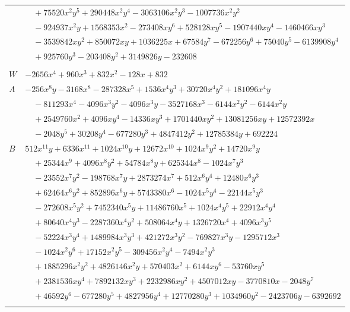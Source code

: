 \documentclass[11pt]{article}
\begin{document}
\begin{longtable}{@{}ll@{}}
 & $\quad +75520x^{2}y^{5}+290448x^{2}y^{4}-3063106x^{2}y^{3}-1007736x^{2}y^{2}$\\
 & $\quad -924937x^{2}y+1568353x^{2}-273408xy^{6}+528128xy^{5}-1907440xy^{4}-1460466xy^{3}$\\
 & $\quad -3539842xy^{2}+850072xy+1036225x+67584y^{7}-672256y^{6}+75040y^{5}-6139908y^{4}$\\
 & $\quad +925760y^{3}-203408y^{2}+3149826y-232608$\\
\addlinespace[3pt]
\multicolumn{2}{@{}l}{$i=20$, $m=16$, neighbours $0,5,9,14,15,21,37$}\\
$W$ & $-2656x^{4}+960x^{3}+832x^{2}-128x+832$\\
$A$ & $-256x^{8}y-3168x^{8}-287328x^{5}+1536x^{4}y^{3}+30720x^{4}y^{2}+181096x^{4}y$\\
 & $\quad -811293x^{4}-4096x^{3}y^{2}-4096x^{3}y-3527168x^{3}-6144x^{2}y^{2}-6144x^{2}y$\\
 & $\quad +2549760x^{2}+4096xy^{4}-14336xy^{3}+1701440xy^{2}+13081256xy+12572392x$\\
 & $\quad -2048y^{5}+30208y^{4}-677280y^{3}+4847412y^{2}+12785384y+692224$\\
$B$ & $512x^{11}y+6336x^{11}+1024x^{10}y+12672x^{10}+1024x^{9}y^{2}+14720x^{9}y$\\
 & $\quad +25344x^{9}+4096x^{8}y^{2}+54784x^{8}y+625344x^{8}-1024x^{7}y^{3}$\\
 & $\quad -23552x^{7}y^{2}-198768x^{7}y+2873274x^{7}+512x^{6}y^{4}+12480x^{6}y^{3}$\\
 & $\quad +62464x^{6}y^{2}+852896x^{6}y+5743380x^{6}-1024x^{5}y^{4}-22144x^{5}y^{3}$\\
 & $\quad -272608x^{5}y^{2}+7452340x^{5}y+11486760x^{5}+1024x^{4}y^{5}+22912x^{4}y^{4}$\\
 & $\quad +80640x^{4}y^{3}-2287360x^{4}y^{2}+508064x^{4}y+1326720x^{4}+4096x^{3}y^{5}$\\
 & $\quad -52224x^{3}y^{4}+1489984x^{3}y^{3}+421272x^{3}y^{2}-769827x^{3}y-1295712x^{3}$\\
 & $\quad -1024x^{2}y^{6}+17152x^{2}y^{5}-309456x^{2}y^{4}-7494x^{2}y^{3}$\\
 & $\quad +1885296x^{2}y^{2}+4826146x^{2}y+570403x^{2}+6144xy^{6}-53760xy^{5}$\\
 & $\quad +2381536xy^{4}+7892132xy^{3}+2232986xy^{2}+4507012xy-3770810x-2048y^{7}$\\
 & $\quad +46592y^{6}-677280y^{5}+4827956y^{4}+12770280y^{3}+1034960y^{2}-2423706y-6392692$\\
\addlinespace[3pt]

\end{longtable}
\end{document}
